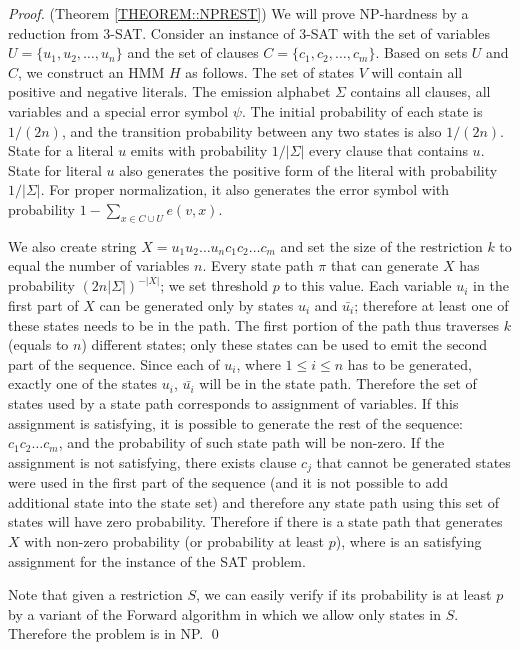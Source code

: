 \begin{proof}(Theorem \ref{THEOREM::NPREST})
We will prove NP-hardness by a reduction from 3-SAT. Consider an
instance of 3-SAT with the set of variables $U=\{u_1,u_2,\dots,u_n\}$
and the set of clauses $C=\{c_1,c_2,\dots,c_m\}$. 
Based on sets $U$ and $C$, we construct an HMM $H$ as
follows.  The set of states $V$ will contain all positive and negative
literals. The emission alphabet $\Sigma$ contains all clauses, all
variables and a special error symbol $\psi$. The initial probability
of each state is $1/(2n)$, and the transition probability
between any two states is also $1/(2n)$. State for a literal
$u$ emits with probability $1/|\Sigma|$ every clause that contains $u$.
State for literal $u$ also generates the positive form of the literal
with probability $1/|\Sigma|$. For proper normalization, 
it also generates the error symbol 
with probability $1-\sum_{x\in C\cup U}e(v,x)$. 

We also create string $X=u_1u_2\dots
u_nc_1c_2\dots c_m$ and set the size of the restriction $k$ to equal
the number of variables $n$. Every state path $\pi$ that can generate
$X$ has probability $(2n|\Sigma|)^{-|X|}$; we set threshold $p$ to
this value. Each 
variable $u_i$ in the first part of $X$ 
can be generated only by states $u_i$ and
$\bar{u_i}$; therefore at least one of these states needs to be in the
path. The first portion of the path thus traverses $k$ (equals to $n$) 
different states; only these states can be used to emit the second part of the
sequence. Since each of $u_i$, where $1\leq i\leq n$ has to be generated,
exactly one of the states $u_i$, $\bar{u_i}$ will be in the state path.
Therefore the set of states used by a state path corresponds to assignment of
variables.  If this assignment is satisfying, it is possible to generate the
rest of the sequence: $c_1c_2\dots c_m$, and the probability of such state path
will be non-zero. If the assignment is not satisfying, there exists clause
$c_j$ that cannot be generated states were used in the first part of the
sequence (and it is not possible to add additional state into the state set)
and therefore any state path using this set of states will have zero
probability. Therefore if there is a state path that generates $X$ with
non-zero probability (or probability at least $p$), where is an satisfying
assignment for the instance of the SAT problem.

Note that given a restriction $S$, we can easily verify if its
probability is at least $p$ by a variant of the Forward algorithm
in which we allow only states in $S$. Therefore the problem is in NP.
\qed
\end{proof}

